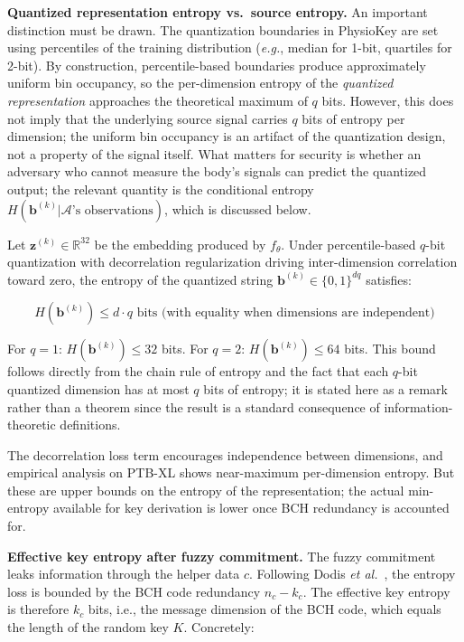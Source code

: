 \documentclass[sensors,article,submit,pdftex,moreauthors]{Definitions/mdpi}
\newcommand{\eg}{\textit{e.g.}}
\newcommand{\etal}{\textit{et al.}}
\begin{document}
\textbf{Quantized representation entropy vs.\ source entropy.} An important distinction must be drawn. The quantization boundaries in PhysioKey are set using percentiles of the training distribution (\eg, median for 1-bit, quartiles for 2-bit). By construction, percentile-based boundaries produce approximately uniform bin occupancy, so the per-dimension entropy of the \textit{quantized representation} approaches the theoretical maximum of $q$ bits. However, this does not imply that the underlying source signal carries $q$ bits of entropy per dimension; the uniform bin occupancy is an artifact of the quantization design, not a property of the signal itself. What matters for security is whether an adversary who cannot measure the body's signals can predict the quantized output; the relevant quantity is the conditional entropy $H(\mathbf{b}^{(k)} | \mathcal{A}\text{'s observations})$, which is discussed below.

\begin{Remark}
\label{rem:entropy}
Let $\mathbf{z}^{(k)} \in \mathbb{R}^{32}$ be the embedding produced by $f_\theta$. Under percentile-based $q$-bit quantization with decorrelation regularization driving inter-dimension correlation toward zero, the entropy of the quantized string $\mathbf{b}^{(k)} \in \{0,1\}^{dq}$ satisfies:

\begin{equation}
\label{eq:quant_entropy}
H(\mathbf{b}^{(k)}) \leq d \cdot q \text{ bits (with equality when dimensions are independent)}
\end{equation}

For $q = 1$: $H(\mathbf{b}^{(k)}) \leq 32$ bits. For $q = 2$: $H(\mathbf{b}^{(k)}) \leq 64$ bits. This bound follows directly from the chain rule of entropy and the fact that each $q$-bit quantized dimension has at most $q$ bits of entropy; it is stated here as a remark rather than a theorem since the result is a standard consequence of information-theoretic definitions.
\end{Remark}

The decorrelation loss term encourages independence between dimensions, and empirical analysis on PTB-XL shows near-maximum per-dimension entropy. But these are upper bounds on the entropy of the representation; the actual min-entropy available for key derivation is lower once BCH redundancy is accounted for.

\textbf{Effective key entropy after fuzzy commitment.} The fuzzy commitment leaks information through the helper data $c$. Following Dodis \etal~\cite{dodis2008fuzzy}, the entropy loss is bounded by the BCH code redundancy $n_c - k_c$. The effective key entropy is therefore $k_c$ bits, i.e., the message dimension of the BCH code, which equals the length of the random key $K$. Concretely:
\end{document}
